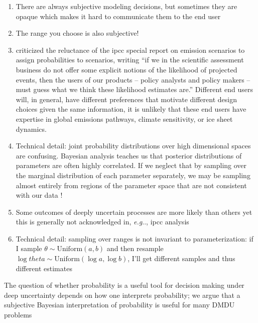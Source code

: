 \documentclass[11pt]{article}
\makeatletter
\DeclareRobustCommand\onedot{\futurelet\@let@token\@onedot}
\def\@onedot{\ifx\@let@token.\else.\null\fi\xspace}
\def\eg{\emph{e.g}\onedot} \def\Eg{\emph{E.g}\onedot}
\DeclareRobustCommand\onedot{\futurelet\@let@token\@onedot}
\def\@onedot{\ifx\@let@token.\else.\null\fi\xspace}
\def\eg{\emph{e.g}\onedot} \def\Eg{\emph{E.g}\onedot}
\makeatother
\begin{document}
\begin{enumerate}
    \item There are always subjective  modeling decisions, but sometimes they are opaque which makes it hard to communicate them to the end user
    \item The range you choose is also subjective! \citep{schneider_dangerous:2001,schneider_scenarios:2002}
    \item \citet{schneider_scenarios:2002} criticized the reluctance of the \gls{ipcc} special report on emission scenarios \citep{nakicenovic_scenarios:2000} to assign probabilities to scenarios, writing ``if we in the scientific assessment business do not offer some explicit notions of the likelihood of projected events, then the users of our products -- policy analysts and policy makers -- must guess what we think these likelihood estimates are.'' Different end users will, in general, have different preferences that motivate different design choices given the same information, it is unlikely that these end users have expertise in global emissions pathways, climate sensitivity, or ice sheet dynamics.
    \item Technical detail: joint probability distributions over high dimensional spaces are confusing. Bayesian analysis teaches us that posterior distributions of parameters are often highly correlated. If we neglect that by sampling over the marginal distribution of each parameter separately, we may be sampling almost entirely from regions of the parameter space that are not consistent with our data \citep[see][for a detailed illustration]{carpenter_dimensionality:2017}!
    \item Some outcomes of deeply uncertain processes are more likely than others \citep{hausfather_scenarios:2020,ho_scenarios:2019,srikrishnan_probabilistic:2022} yet this is generally not acknowledged in, \eg, \gls{ipcc} analysis
    \item Technical detail: sampling over ranges is not invariant to parameterization: if I sample $\theta \sim \mathrm{Uniform}(a, b)$ and then resample $\log theta \sim \mathrm{Uniform}(\log a, \log b)$, I'll get different samples and thus different estimates
\end{enumerate}
The question of whether probability is a useful tool for decision making under deep uncertainty depends on how one interprets probability; we argue that a subjective Bayesian interpretation of probability is useful for many DMDU problems
\end{document}

